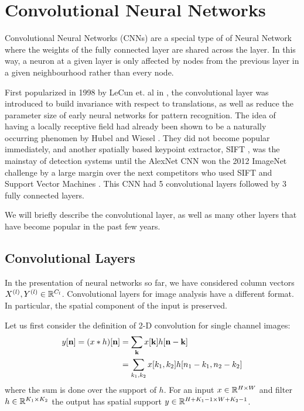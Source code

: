 \section{Convolutional Neural Networks}
Convolutional Neural Networks (CNNs) are a special type of of Neural Network where the
weights of the fully connected layer are shared across the layer. 
In this way, a neuron at a given layer is only affected by
nodes from the previous layer in a given neighbourhood rather than every node.

First popularized in 1998 by LeCun et. al in \cite{lecun_gradient-based_1998},
the convolutional layer was introduced to build invariance with respect to
translations, as well as reduce the parameter size of early neural networks for
pattern recognition. The idea of having a locally receptive field had already
been shown to be a naturally occurring phenomen by Hubel and Wiesel
\cite{hubel_receptive_1962}. They did not become popular immediately, and
another spatially based keypoint extractor, SIFT \cite{lowe_distinctive_2004},
was the mainstay of detection systems until the AlexNet CNN
\cite{krizhevsky_imagenet_2012} won the 2012 ImageNet challenge
\cite{russakovsky_imagenet_2014} by a large margin over the next competitors who
used SIFT and Support Vector Machines \cite{cortes_support-vector_1995}. This
CNN had 5 convolutional layers followed by 3 fully connected layers.

We will briefly describe the convolutional layer, as well as many other layers
that have become popular in the past few years.

\subsection{Convolutional Layers}
In the presentation of neural networks so far, we have considered column vectors 
$X^{(l)},Y^{(l)} \in \reals[C_{l}]$. Convolutional layers for image analysis
have a different format. In particular, the spatial component of the input is
preserved. 

Let us first consider the definition of 2-D convolution for single channel
images:
\begin{align}
  y[\nn] = (x\conv h)[\nn] &= \sum_{\mathbf{k}} x[\mathbf{k}]h[\nn-\mathbf{k}] \label{eq:ch2:conv1}\\
                           &= \sum_{k_1, k_2} x[k_1,k_2]h[n_1-k_1, n_2-k_2]
\end{align}
where the sum is done over the support of $h$. For an input $x\in \reals[H\x W]$
and filter $h\in \reals[K_1\x K_2]$ the output has spatial support $y\in
\reals[H+K_1-1 \x W+K_2-1]$. 


